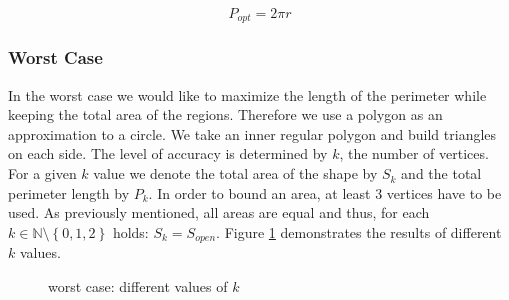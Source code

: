 \begin{equation}\label{eq:P_opt}
P_{opt} = 2\pi r
\end{equation}

\subsubsection{\WFD Worst Case}
In the worst case we would like to maximize the length of the perimeter while
keeping the total area of the \openspace regions. Therefore we use a polygon as
an approximation to a circle. We take an inner regular polygon and build
triangles on each side. The level of accuracy is determined by $k$, the number
of vertices.
For a given $k$ value we denote the total area of the shape by $S_k$ and the
total perimeter length by $P_k$. In order to bound an area, at least 3
vertices have to be used. As previously mentioned, all areas are equal and thus,
for each $k \in \mathbb{N}\setminus\left\{0,1,2\right\}$ holds: $S_k = S_{open}$.
Figure \ref{fig:wfd_worst_case_polygons} demonstrates the results of different
$k$ values.

\begin{figure}
 \centering
 \subfigure[$k=4$] {
	 
	 \label{fig:polygon_4}
 }
 \subfigure[$k=8$] {
	 
	 \label{fig:polygon_8}
 }
 \subfigure[$k=16$] {
	 
	 \label{fig:polygon_16}
 }
 \subfigure[$k=32$] {
	 
	 \label{fig:polygon_32}
 }
 \caption{\WFD worst case: different values of $k$}
 \label{fig:wfd_worst_case_polygons}
\end{figure}


